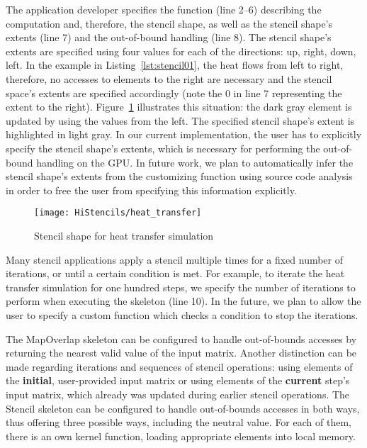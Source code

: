 The application developer specifies the function (line 2--6) describing the computation and, therefore, the stencil shape, as well as the stencil shape's extents (line 7) and the out-of-bound handling (line 8).
The stencil shape's extents are specified using four values for each of the directions:
up, right, down, left.
In the example in Listing~\ref{lst:stencil01}, the heat flows from left to right, therefore, no accesses to elements to the right are necessary and the stencil space's extents are specified accordingly (note the $0$ in line 7 representing the extent to the right).
Figure~\ref{fig:stencilShape} illustrates this situation: the dark gray element is updated by using the values from the left.
The specified stencil shape's extent is highlighted in light gray.
In our current implementation, the user has to explicitly specify the stencil shape's extents, which is necessary for performing the out-of-bound handling on the GPU.
In future work, we plan to automatically infer the stencil shape's extents
from the customizing function using source code analysis in order to free the user from specifying this information explicitly.
\begin{figure}
  \begin{centering}
    \texttt{[image: HiStencils/heat\_transfer]}
    \caption{Stencil shape for heat transfer simulation}
    \label{fig:stencilShape}
    \vspace{-.5em}
  \end{centering}
\end{figure}

Many stencil applications apply a stencil multiple times for a fixed number of iterations, or until a certain condition is met.
For example, to iterate the heat transfer simulation for one hundred steps, we specify the number of iterations to perform when executing the skeleton (line 10).
In the future, we plan to allow the user to specify a custom function which checks a condition to stop the iterations.

The MapOverlap skeleton can be configured to handle out-of-bounds accesses by returning the nearest valid value of the input matrix.
Another distinction can be made regarding iterations and sequences of stencil operations:
using elements of the \textbf{initial}, user-provided input matrix or using elements of the \textbf{current} step's input matrix, which already was updated during earlier stencil operations.
The Stencil skeleton can be configured to handle out-of-bounds accesses in both ways, thus offering three possible ways, including the neutral value. 
For each of them, there is an own kernel function, loading appropriate elements into local memory. 






